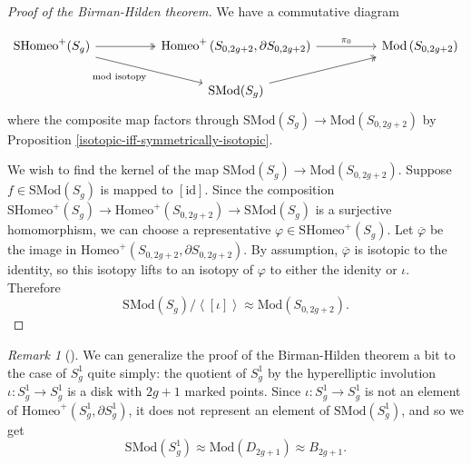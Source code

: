 \documentclass[reqno]{amsart}
\theoremstyle{definition}
\theoremstyle{remark}
\newtheorem*{remark}{Remark}
\newcommand{\id}{{\mathrm{id}}}
\newcommand{\Mod}{{\mathrm{Mod}}}
\newcommand{\SMod}{{\mathrm{SMod}}}
\newcommand{\Homeo}{{\mathrm{Homeo}}}
\newcommand{\SHomeo}{{\mathrm{SHomeo}}}
\begin{document}
   \begin{proof}[Proof of the Birman-Hilden theorem]
       We have a commutative diagram

       \begin{equation*}
       \begin{tikzcd}
           \SHomeo^{+} (S_g) \ar[drr, "\text{mod isotopy}"']  \ar[rr, twoheadrightarrow] & &
           \Homeo^{+}\left( S_{0,2g+2}, \partial
           S_{0,2g+2}\right) 
           \ar[rr, "\pi_0"]  & & \Mod \left( S_{0,2g+2} \right) \\
                    &  & \SMod(S_g) \ar[rru, twoheadrightarrow] &  &
       \end{tikzcd}
       \end{equation*}
       where the composite
       map factors through $\SMod \left( S_g \right) 
       \to \Mod \left( S_{0,2g+2} \right) $ by
       Proposition \ref{isotopic-iff-symmetrically-isotopic}.


       We wish to find the kernel of
       the map $\SMod (S_g) \to \Mod \left( S_{0,2g+2} \right) $.
       Suppose $f \in \SMod(S_g)$ is mapped
       to $\left[ \id \right] $. Since the composition
       $\SHomeo^{+}(S_g) \to \Homeo^{+} \left( S_{0,2g+2} \right) 
       \to \SMod \left( S_g \right) $ is a surjective
       homomorphism, we can choose a representative
       $\varphi  \in \SHomeo^{+} \left( S_g \right) $.
       Let $\overline{\varphi  }$ be the image
       in $\Homeo^{+} \left( S_{0,2g+2} ,
       \partial S_{0,2g+2}\right) $.
       By assumption, $\overline{\varphi }$ is isotopic
       to the identity, so this isotopy lifts
       to an isotopy of $\varphi $ to either the idenity
       or $\iota$. Therefore
       \[
       \SMod \left( S_g \right) / \left<\left[ \iota \right]  \right>
       \approx \Mod \left( S_{0,2g+2} \right) .
       \] 
       
   \end{proof}


   \begin{remark}[]
       We can generalize the proof of the Birman-Hilden
       theorem a bit to the case of $S_g^{1}$ quite simply:
       the quotient of $S_g^{1}$ by the hyperelliptic
       involution $\iota \colon S_g^{1}\to 
       S_g^{1}$ is a disk with $2g+1$ marked points.
       Since  $\iota \colon S_g^{1} \to 
       S_g^{1}$ is not an element of
       $\Homeo^{+}\left( S_g^{1}, \partial
       S_g^{1}\right) $, it does not represent an
       element of $\SMod(S_g^{1})$, and so we 
       get 
       \[ \SMod \left( S_g^{1} \right) 
       \approx \Mod \left( D_{2g+1} \right) 
   \approx B_{2g+1}.\]
   \end{remark}
\end{document}
